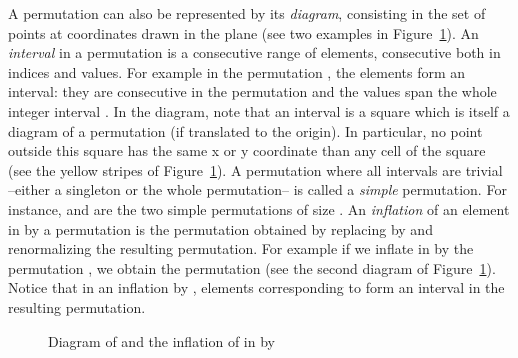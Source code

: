 \documentclass[11pt]{article}
\newcounter{indice}
\begin{document}
A permutation can also be represented by its
{\it diagram}, consisting in the set of points at coordinates  drawn in the plane
(see two examples in Figure~\ref{fig:graphicalRepresentation}).
An {\em interval} in a permutation is a consecutive range of elements, consecutive both in indices and values. 
For example in the permutation , the elements  form an interval: 
they are consecutive in the permutation and the values span the whole integer interval . 
In the diagram, note that an interval is a square
which is itself a diagram of a permutation (if translated to the origin).
In particular, no point outside this square has the same x or y coordinate than any cell of the square
(see the yellow stripes of Figure~\ref{fig:graphicalRepresentation}).
A permutation where all intervals are trivial --either a singleton or the whole permutation-- is called a {\em simple} permutation. 
For instance,  and  are the two simple permutations of size .
An {\em inflation} of an element  in  by a permutation  is the permutation obtained 
by replacing  by  and renormalizing the resulting permutation. 
For example if we inflate  in  by the permutation , 
we obtain the permutation 
(see the second diagram of Figure~\ref{fig:graphicalRepresentation}).
Notice that in an inflation by , elements corresponding to  form an interval in the resulting permutation.

\begin{figure}[H]
\begin{center}
\caption{Diagram of  and the inflation of  in  by 
\label{fig:graphicalRepresentation}}
\end{center}
\end{figure}
\end{document}
